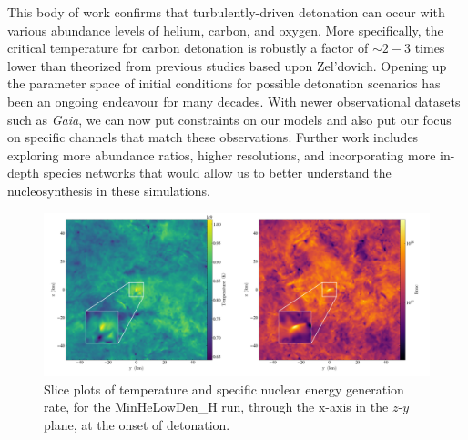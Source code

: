This body of work confirms that turbulently-driven detonation can occur with various abundance levels of helium, carbon, and oxygen. More specifically, the critical temperature for carbon detonation is robustly a factor of $\sim 2-3$ times lower than theorized from previous studies based upon Zel'dovich. Opening up the parameter space of initial conditions for possible detonation scenarios has been an ongoing endeavour for many decades. With newer observational datasets such as \textit{Gaia}, we can now put constraints on our models and also put our focus on specific channels that match these observations. Further work includes exploring more abundance ratios, higher resolutions, and incorporating more in-depth species networks that would allow us to better understand the nucleosynthesis in these simulations.

\begin{center}
\begin{figure}[!htb]

\includegraphics[width=1.0\textwidth]{combined_512_10e5_0.1_new.png}
\centering
\caption[Slice plots of temperature and specific nuclear energy generation rate, for the MinHeLowDen\_H run]{Slice plots of temperature and specific nuclear energy generation rate, for the MinHeLowDen\_H run, through the x-axis in the $z$-$y$ plane, at the onset of detonation.}
\label {fig:temp_enuc}
         
\end{figure}
\end{center}

